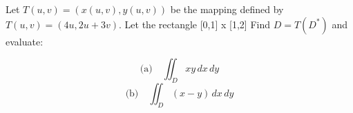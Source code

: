 Let $T(u, v) = (x(u, v), y(u, v))$ be the mapping defined by $T(u, v) = (4u, 2u+3v).$ Let the rectangle [0,1] x [1,2]
Find $D = T(D^*)$ and evaluate:

\[
\text{(a)} \quad \iint_D xy \, dx \, dy
\]
\[
\text{(b)} \quad \iint_D (x - y) \, dx \, dy
\]
